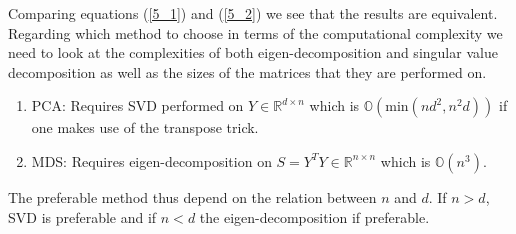 Comparing equations (\ref{5_1}) and (\ref{5_2}) we see that the results are equivalent. \\

Regarding which method to choose in terms of the computational complexity we need to look at the complexities of both eigen-decomposition and singular value decomposition as well as the sizes of the matrices that they are performed on.

\begin{enumerate}
  \item PCA: Requires SVD performed on  $Y \in \mathbb{R}^{d \times n}$ which is $\mathbb{O}(\text{min}(nd^2,n^2d))$ if one makes use of the transpose trick.
  \item MDS: Requires eigen-decomposition on $S = Y^TY \in \mathbb{R}^{n \times n}$ which is $\mathbb{O}(n^3)$.
\end{enumerate}

The preferable method thus depend on the relation between $n$ and $d$. If $n > d$, SVD is preferable and if $n < d$ the eigen-decomposition if preferable. 
